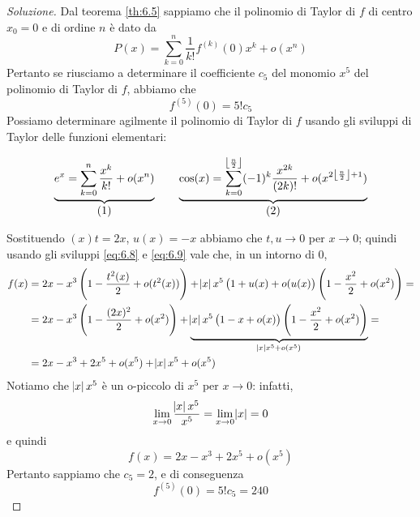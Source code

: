\begin{proof}[Soluzione]
    Dal teorema \ref{th:6.5} sappiamo che il polinomio di Taylor di $f$ di centro $x_0=0$ e di ordine $n$ è dato da 
    \[
    P(x) = \sum_{k=0}^n \frac{1}{k!}f^{(k)}(0) x^k +o(x^n)
    \]
    Pertanto se riusciamo a determinare il coefficiente $c_5$ del monomio $x^5$ del polinomio di Taylor di $f$, abbiamo che
    \[
    f^{(5)}(0) = 5!c_5
    \]
    Possiamo determinare agilmente il polinomio di Taylor di $f$ usando gli sviluppi di Taylor delle funzioni elementari:
    \begin{tcolorbox}
    \[
    \underbrace{e^x = \sum_{k=0}^n \frac{x^k}{k!}+o(x^n)}_{\stepcounter{equation}\mbox{(\theequation)}} \qquad \underbrace{\cos(x)=\sum_{k=0}^{\left\lfloor \frac{n}{2}\right\rfloor} (-1)^{k}\frac{x^{2k}}{(2k)!}+o(x^{2\left\lfloor \frac{n}{2}\right\rfloor+1})}_{\stepcounter{equation}\mbox{(\theequation)}}
    \]
    \addtocounter{equation}{-2}\label{eq:6.8}
    \addtocounter{equation}{0}\label{eq:6.9}
    \end{tcolorbox}
    Sostituendo $(x)t=2x$, $u(x)=-x$ abbiamo che $t, u \to 0$ per $x\to 0$; quindi usando gli sviluppi \eqref{eq:6.8} e \eqref{eq:6.9} vale che, in un intorno di $0$,
    \[
    \begin{split}
        f(x) & = 2x - x^3\left(1-\frac{t^2(x)}{2}+o(t^2(x))\right)+\abs{x}x^5\left(1+u(x) + o(u(x)\right)\left(1-\frac{x^2}{2}+o(x^2)\right) = \\
        & = 2x - x^3\left(1-\frac{(2x)^2}{2}+o(x^2)\right)+\underbrace{\abs{x}x^5\left(1-x + o(x)\right)\left(1-\frac{x^2}{2}+o(x^2)\right)}_{\abs{x}x^5 + o(x^5)} = \\
        & = 2x-x^3 + 2x^5+o(x^5) +\abs{x}x^5+o(x^5)
    \end{split}
    \]
    Notiamo che $\abs{x}x^5$ è un o-piccolo di $x^5$ per $x\to 0$: infatti,
    \[
    \lim_{x\to 0} \frac{\abs{x}x^5}{x^5} = \lim_{x\to 0}\abs{x} = 0
    \]
    e quindi
    \[
    f(x)  = 2x-x^3 + 2x^5+o(x^5)
    \]
    Pertanto sappiamo che $c_5 = 2$, e di conseguenza
    \[
    f^{(5)}(0)= 5! c_5 = 240
    \]
\end{proof}
\newpage